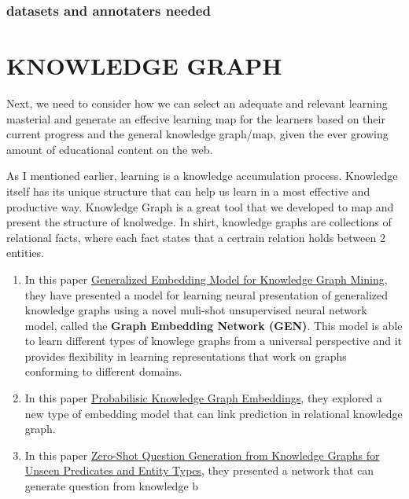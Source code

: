 \documentclass[]{book}
\theoremstyle{definition}
\theoremstyle{definition}
\theoremstyle{definition}
\theoremstyle{remark}
\begin{document}
\subsection{datasets and annotaters
needed}\label{datasets-and-annotaters-needed}

\chapter{KNOWLEDGE GRAPH}\label{knowledge-graph}

Next, we need to consider how we can select an adequate and relevant
learning masterial and generate an effecive learning map for the
learners based on their current progress and the general knowledge
graph/map, given the ever growing amount of educational content on the
web.

As I mentioned earlier, learning is a knowledge accumulation process.
Knowledge itself has its unique structure that can help us learn in a
most effective and productive way. Knowledge Graph is a great tool that
we developed to map and present the structure of knolwedge. In shirt,
knowledge graphs are collections of relational facts, where each fact
states that a certrain relation holds between 2 entities.

\begin{enumerate}
\def\labelenumi{\arabic{enumi}.}
\item
  In this paper
  \href{http://www.mlgworkshop.org/2018/papers/MLG2018_paper_5.pdf}{Generalized
  Embedding Model for Knowledge Graph Mining}, they have presented a
  model for learning neural presentation of generalized knowledge graphs
  using a novel muli-shot unsupervised neural network model, called the
  \textbf{Graph Embedding Network (GEN)}. This model is able to learn
  different types of knowlege graphs from a universal perspective and it
  provides flexibility in learning representations that work on graphs
  conforming to different domains.
\item
  In this paper
  \href{https://openreview.net/pdf?id=rJ4qXnCqFX}{Probabilisic Knowledge
  Graph Embeddings}, they explored a new type of embedding model that
  can link prediction in relational knowledge graph.
\item
  In this paper \href{http://aclweb.org/anthology/N18-1020}{Zero-Shot
  Question Generation from Knowledge Graphs for Unseen Predicates and
  Entity Types}, they presented a network that can generate question
  from knowledge b
\end{enumerate}
\end{document}
